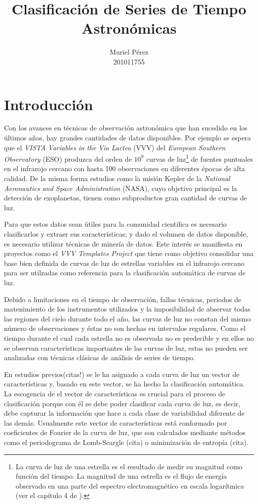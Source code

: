 \documentclass[letterpaper,12pt]{book}
\title{Clasificación de Series de Tiempo Astronómicas}
\author{Muriel Pérez\\ 201011755}
\begin{document}
\maketitle
\tableofcontents 
\chapter{Introducción}

Con los avances en técnicas de observación astronómica que han sucedido en los últimos años, hay grandes cantidades de datos disponibles. Por ejemplo se espera que el \textit{VISTA Variables in the Via Lactea} (VVV) del \textit{European Southern Observatory} (ESO) produzca del orden de $10^{9}$ curvas de luz\footnote{\label{nota:curvasDeLuz} La curva de luz de una estrella es el resultado de medir su magnitud como función del tiempo. La magnitud de una estrella es el flujo de energía observado en una parte del espectro electromagnético en escala logarítmica (ver el capítulo 4 de \cite{karttunen_fundamental_2007}).} de fuentes puntuales en el infrarojo cercano con hasta 100 observaciones en diferentes épocas de alta calidad. De la misma forma estudios como la misión Kepler de la \textit{National Aeronautics and Space Administration} (NASA), cuyo objetivo principal es la detección de exoplanetas,  tienen como subproductos gran cantidad de curvas  de luz. 

Para que estos datos sean útiles para la comunidad científica es necesario clasificarlos y extraer sus características; y dado el volumen de datos disponible, es necesario utilizar técnicas de minería de datos. Este interés se manifiesta en proyectos como el \textit{VVV Templates Project} que tiene como objetivo consolidar una base bien definida de curvas de luz de estrellas variables en el infrarojo cercano para ser utilzadas como referencia para la clasificación automática de curvas de luz.

Debido a limitaciones en el tiempo de observación, fallas técnicas, periodos de matenimiento de los instrumentos utilizados y la imposibilidad de abservar todas las regiones del cielo durante todo el año, las curvas de luz no constan del mismo número de observaciones y éstas no son hechas en intervalos regulares. Como el tiempo durante el cual cada estrella no es observada no es predecible y en ellos no se observan características importantes de las curvas de luz,  estas no pueden ser analizadas con técnicas clásicas de análisis de series de tiempo.

En estudios previos(citas!) se le ha asignado a cada curva de luz un vector de características y, basado en este vector, se ha hecho la clasificación automática. La escogencia de el vector de características es crucial para el proceso de clasificación porque con él se debe poder clasificar cada curva de luz, es decir, debe capturar la información que hace a cada clase de variabilidad diferente de las demás. Usualmente este vector de características está conformado por coeficientes de Fourier de la curva de luz, que son calculados mediante métodos como el periodograma de  Lomb-Scargle (cita) o minimización de entropía (cita). 
\end{document}
